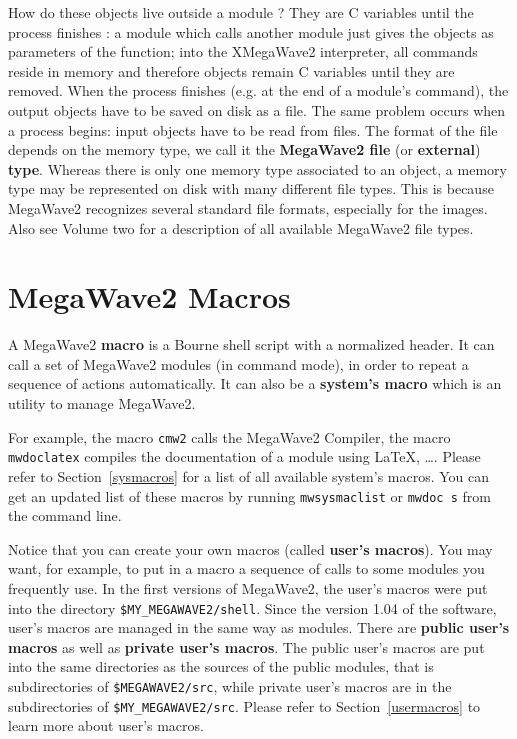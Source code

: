 How do these objects live outside a module ? They are C variables until the process finishes : a module which calls another module just gives the objects as parameters of the function; into the XMegaWave2 interpreter, all commands reside in memory and therefore objects remain C variables until they are removed.
When the process finishes (e.g. at the end of a module's command), the output objects have to be saved on disk as a file.
The same problem occurs when a process begins: input objects have to be read from files.
The format of the file depends on the memory type, we call it the {\bf MegaWave2 file} 
(or {\bf external}) {\bf type}.
Whereas there is only one memory type associated to an object, a memory type may be represented on disk with many different file types.
This is because MegaWave2 recognizes several standard file formats, especially for the images. 
Also see Volume two for a description of all available MegaWave2 file types.


\section{MegaWave2 Macros}
\label{intro_macros}

A MegaWave2 {\bf macro} is a Bourne shell script with a normalized header.
It can call a set of MegaWave2 modules (in command mode), in order to repeat a sequence of actions automatically.
It can also be a {\bf system's macro} which is an utility to manage MegaWave2.

For example, the macro \verb+cmw2+ calls the MegaWave2 Compiler, the macro 
\verb+mwdoclatex+ compiles the documentation of a module using \LaTeX{},
\ldots.
Please refer to Section~\ref{sysmacros} for a list of all available system's macros.
You can get an updated list of these macros by running \verb+mwsysmaclist+ or
\verb+mwdoc s+ from the command line.

Notice that you can create your own macros (called {\bf user's macros}).
You may want, for example, to put in a macro a sequence of calls to some
modules you frequently use.
In the first versions of MegaWave2, the user's macros were put into the directory 
\verb+$MY_MEGAWAVE2/shell+. 
Since the version 1.04 of the software, user's macros are managed in the same way as modules.
There are {\bf public user's macros} as well as {\bf private user's macros}.
The public user's macros are put into the same directories as the sources of the public modules, 
that is subdirectories of \verb+$MEGAWAVE2/src+, while private user's macros are in the
subdirectories of \verb+$MY_MEGAWAVE2/src+.
Please refer to Section~\ref{usermacros} to learn more about user's macros.

